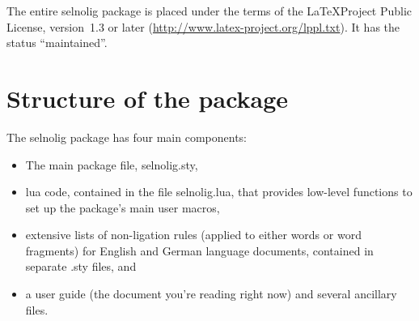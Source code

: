 \documentclass[12pt]{article}
\newcommand{\pkg}[1]{\textsf{#1}}
\begin{document}
The entire \pkg{selnolig} package is placed under the terms of the \LaTeX Project Public License, version~1.3 or later (\url{http://www.latex-project.org/lppl.txt}).
It has the status \enquote{maintained}.


\section{Structure of the package}

The \pkg{selnolig} package has four main components:
\begin{itemize}
\item The main package file, \pkg{selnolig.sty},
\item lua code, contained in the file \pkg{selnolig.lua}, that provides low-level functions to set up the package's main user macros,
\item extensive lists of non-ligation rules (applied to either words or word fragments) for English and German language documents, contained in separate \pkg{.sty} files, and
\item a user guide (the document you're reading right now) and several ancillary files.
\end{itemize}
\end{document}
